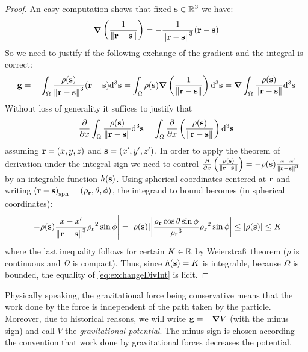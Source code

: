 \documentclass[../main.tex]{subfiles}
\begin{document}
\begin{proof}
  An easy computation shows that fixed $\boldsymbol{\mathrm{s}}\in\mathbb{R}^3$ we have:
  \begin{equation}
    \grad\left(\frac{1}{\left\|\boldsymbol{\mathrm{r}}-\boldsymbol{\mathrm{s}}\right\|}\right)=-\frac{1}{\left\|\boldsymbol{\mathrm{r}}-\boldsymbol{\mathrm{s}}\right\|^3}(\boldsymbol{\mathrm{r}}-\boldsymbol{\mathrm{s}})
  \end{equation}
  So we need to justify if the following exchange of the gradient and the integral is correct:
  \begin{equation}
    \boldsymbol{\mathrm{g}}=-\int_{\Omega}\frac{\rho(\boldsymbol{\mathrm{s}})}{\left\|\boldsymbol{\mathrm{r}}-\boldsymbol{\mathrm{s}}\right\|^3}(\boldsymbol{\mathrm{r}}-\boldsymbol{\mathrm{s}})\dd^3{\boldsymbol{\mathrm{s}}}=\int_{\Omega}\rho(\boldsymbol{\mathrm{s}})\grad\left(\frac{1}{\left\|\boldsymbol{\mathrm{r}}-\boldsymbol{\mathrm{s}}\right\|}\right)\dd^3{\boldsymbol{\mathrm{s}}}=\grad\int_{\Omega}\frac{\rho(\boldsymbol{\mathrm{s}})}{\left\|\boldsymbol{\mathrm{r}}-\boldsymbol{\mathrm{s}}\right\|}\dd^3{\boldsymbol{\mathrm{s}}}
  \end{equation}
  Without loss of generality it suffices to justify that
  \begin{equation}\label{eq:exchangeDivInt}
    \pdv{}{x}\int_{\Omega}\frac{\rho(\boldsymbol{\mathrm{s}})}{\left\|\boldsymbol{\mathrm{r}}-\boldsymbol{\mathrm{s}}\right\|}\dd^3{\boldsymbol{\mathrm{s}}}=\int_{\Omega}\pdv{}{x}\left(\frac{\rho(\boldsymbol{\mathrm{s}})}{\left\|\boldsymbol{\mathrm{r}}-\boldsymbol{\mathrm{s}}\right\|}\right)\dd^3{\boldsymbol{\mathrm{s}}}
  \end{equation}
  assuming $\boldsymbol{\mathrm{r}}=(x,y,z)$ and $\boldsymbol{\mathrm{s}}=(x',y',z')$. In order to apply the theorem of derivation under the integral sign we need to control $\pdv{}{x}\left(\frac{\rho(\boldsymbol{\mathrm{s}})}{\left\|\boldsymbol{\mathrm{r}}-\boldsymbol{\mathrm{s}}\right\|}\right)=-\rho(\boldsymbol{\mathrm{s}})\frac{x-x'}{\left\|\boldsymbol{\mathrm{r}}-\boldsymbol{\mathrm{s}}\right\|^3}$ by an integrable function $h(\boldsymbol{\mathrm{s}})$. Using spherical coordinates centered at $\boldsymbol{\mathrm{r}}$ and writing ${(\boldsymbol{\mathrm{r}}-\boldsymbol{\mathrm{s}})}_{\mathrm{sph}}=(\rho_{\boldsymbol{\mathrm{r}}},\theta,\phi)$, the integrand to bound becomes (in spherical coordinates):
  \begin{equation}
    \abs{-\rho(\boldsymbol{\mathrm{s}})\frac{x-x'}{\left\|\boldsymbol{\mathrm{r}}-\boldsymbol{\mathrm{s}}\right\|^3}{\rho_{\boldsymbol{\mathrm{r}}}}^2\sin\phi}=\abs{\rho(\boldsymbol{\mathrm{s}})}\abs{\frac{{\rho_{\boldsymbol{\mathrm{r}}}}\cos\theta\sin\phi}{{\rho_{\boldsymbol{\mathrm{r}}}}^3}{\rho_{\boldsymbol{\mathrm{r}}}}^2\sin\phi}\leq \abs{\rho(\boldsymbol{\mathrm{s}})}\leq K
  \end{equation}
  where the last inequality follows for certain $K\in\mathbb{R}$ by Weierstra\ss\ theorem ($\rho$ is continuous and $\Omega$ is compact). Thus, since $h(\boldsymbol{\mathrm{s}})=K$ is integrable, because $\Omega$ is bounded, the equality of \cref{eq:exchangeDivInt} is licit.
\end{proof}
Physically speaking, the gravitational force being conservative means that the work done by the force is independent of the path taken by the particle. Moreover, due to historical reasons, we will write $\boldsymbol{\mathrm{g}}=-\grad V$ (with the minus sign) and call $V$ the \emph{gravitational potential}. The minus sign is chosen according the convention that work done by gravitational forces decreases the potential.
\end{document}
